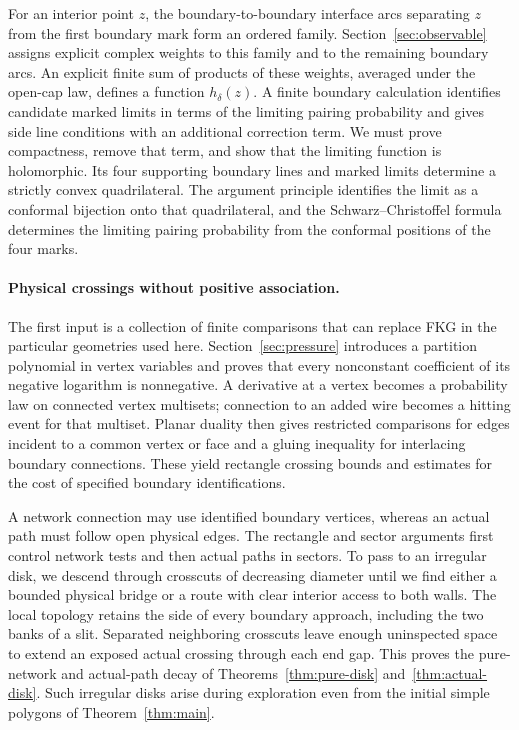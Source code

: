 For an interior point $z$, the boundary-to-boundary interface arcs
separating $z$ from the first boundary mark form an ordered family.
Section~\ref{sec:observable} assigns explicit complex weights to this
family and to the remaining boundary arcs. An explicit finite sum of
products of these weights, averaged under the open-cap law, defines a
function $h_\delta(z)$.
A finite boundary calculation identifies candidate marked limits in
terms of the limiting pairing probability and gives side line conditions
with an additional correction term. We must prove compactness, remove
that term, and show that the limiting function is holomorphic. Its four supporting
boundary lines and marked limits determine a strictly convex
quadrilateral. The argument principle identifies the limit as a
conformal bijection onto that quadrilateral, and the
Schwarz--Christoffel formula determines the limiting pairing
probability from the conformal positions of the four marks.

\paragraph{Physical crossings without positive association.}
The first input is a collection of finite comparisons that can replace
FKG in the particular geometries used here. Section~\ref{sec:pressure}
introduces a partition polynomial in vertex variables and proves that
every nonconstant coefficient of its negative logarithm is nonnegative.
A derivative at a vertex becomes a probability law on connected vertex
multisets; connection to an added wire becomes a hitting event for that
multiset. Planar duality then gives restricted comparisons for edges
incident to a common vertex or face and a gluing inequality for
interlacing boundary connections. These yield rectangle crossing bounds
and estimates for the cost of specified boundary identifications.

A network connection may use identified boundary vertices, whereas an
actual path must follow open physical edges. The rectangle and sector
arguments first control network tests and then actual paths in sectors.
To pass to an irregular disk, we descend through crosscuts of decreasing
diameter until we find either a bounded physical bridge or a route with
clear interior access to both walls. The local topology retains the
side of every boundary approach, including the two banks of a slit.
Separated neighboring crosscuts leave enough uninspected space to
extend an exposed actual crossing through each end gap. This proves
the pure-network and actual-path decay of
Theorems~\ref{thm:pure-disk} and~\ref{thm:actual-disk}.
Such irregular disks arise during exploration even from the initial
simple polygons of Theorem~\ref{thm:main}.

